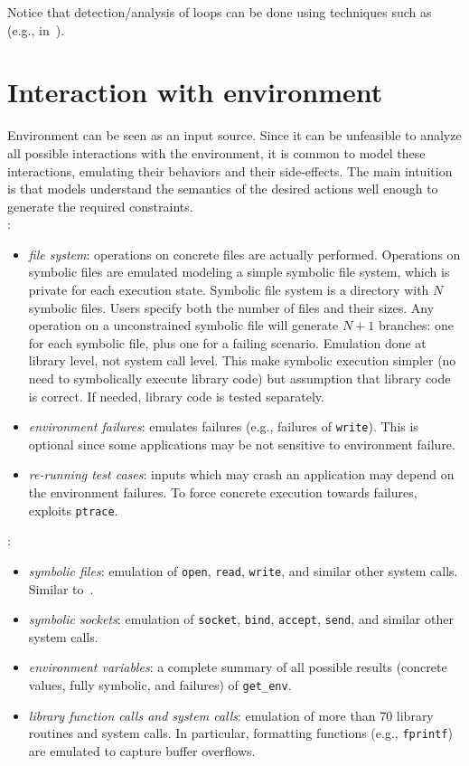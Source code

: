 Notice that detection/analysis of loops can be done using techniques such as~\cite{SGL-TOPLAS96} (e.g., in~\cite{CFB-ACSAC06}).


\section{Interaction with environment}

Environment can be seen as an input source. Since it can be unfeasible to analyze all possible interactions with the environment, it is common to model these interactions, emulating their behaviors and their side-effects. The main intuition is that models understand the semantics of the desired actions well enough to generate the required constraints.\\

\cite{KLEE-OSDI08}:
\begin{itemize}
  \item {\em file system}: operations on concrete files are actually performed. Operations on symbolic files are emulated modeling a simple symbolic file system, which is private for each execution state. Symbolic file system is a directory with $N$ symbolic files. Users specify both the number of files and their sizes. Any operation on a unconstrained symbolic file will generate $N+1$ branches: one for each symbolic file, plus one for a failing scenario. Emulation done at library level, not system call level. This make symbolic execution simpler (no need to symbolically execute library code) but assumption that library code is correct. If needed, library code is tested separately.
  \item {\em environment failures}: \cite{KLEE-OSDI08} emulates failures (e.g., failures of {\tt write}). This is optional since some applications may be not sensitive to environment failure.
  \item {\em re-running test cases}: inputs which may crash an application may depend on the environment failures. To force concrete execution towards failures, \cite{KLEE-OSDI08} exploits {\tt ptrace}.
\end{itemize}

\cite{AEG-NDSS11}:
\begin{itemize}
  \item {\em symbolic files}: emulation of {\tt open}, {\tt read}, {\tt write}, and similar other system calls. Similar to~\cite{KLEE-OSDI08}.
  \item {\em symbolic sockets}: emulation of {\tt socket}, {\tt bind}, {\tt accept}, {\tt send}, and similar other system calls. 
  \item {\em environment variables}: a complete summary of all possible results (concrete values, fully symbolic, and failures) of {\tt get\_env}.
  \item {\em library function calls and system calls}: emulation of more than 70 library routines and system calls. In particular, formatting functions (e.g., {\tt fprintf}) are emulated to capture buffer overflows.
\end{itemize}

